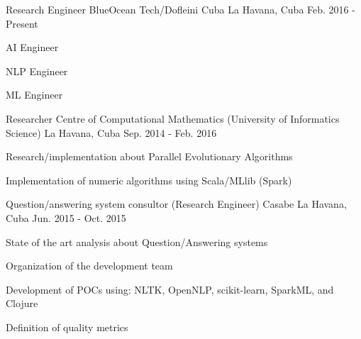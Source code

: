 


\begin{cventries}


\cventry
{Research Engineer} %
{BlueOcean Tech/Dofleini Cuba} %
{La Havana, Cuba} %
{Feb. 2016 - Present} %
{ %
\begin{cvitems}
\item {AI Engineer}
\item {NLP Engineer}
\item {ML Engineer}
\end{cvitems}
}


\cventry
{Researcher} %
{Centre of Computational Mathematics (University of Informatics Science)} %
{La Havana, Cuba} %
{Sep. 2014 - Feb. 2016} %
{ %
\begin{cvitems}
\item {Research/implementation about Parallel Evolutionary Algorithms}
\item {Implementation of numeric algorithms using Scala/MLlib (Spark)}
\end{cvitems}
}


\cventry
{Question/answering system consultor (Research Engineer)} %
{Casabe} %
{La Havana, Cuba} %
{Jun. 2015 - Oct. 2015} %
{ %
\begin{cvitems}
\item {State of the art analysis about Question/Answering systems}
\item {Organization of the development team}
\item {Development of POCs using: NLTK, OpenNLP, scikit-learn, SparkML, and Clojure}
\item {Definition of quality metrics}
\end{cvitems}
}


\end{cventries}
